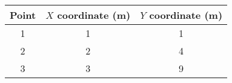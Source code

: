\begin{tabular}{|c|c|c|}
\hline
{Point} & {$X$ coordinate (m)} & {$Y$ coordinate (m) }\\ \hline
1 & 1 & 1 \\ \hline
2 & 2 & 4 \\ \hline
3 & 3 & 9 \\ \hline
\end{tabular}